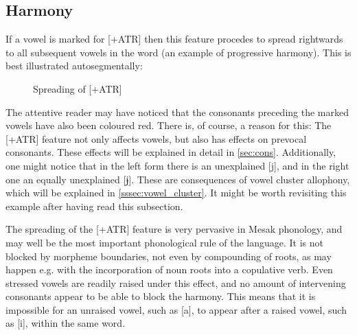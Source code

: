 \documentclass[paper=6in:9in, fontsize=10.5]{scrbook}
\newcommand{\y}{ɨ}
\newcommand{\ý}{ɨ́}
\newcommand{\jbar}{ɉ}
\newcommand{\dom}[1]{\hspace{0pt}{\color{red}#1}}
\begin{document}
\subsection{Harmony} \label{ssec:harmony}

If a vowel is marked for [+ATR] then this feature procedes to spread rightwards to all subsequent vowels in the word (an example of progressive harmony). This is best illustrated autosegmentally:
\begin{figure}[H]
\centering

\caption{Spreading of [+ATR]}
\end{figure}

The attentive reader may have noticed that the consonants preceding the marked vowels have also been coloured red. There is, of course, a reason for this: The [+ATR] feature not only affects vowels, but also has effects on prevocal consonants. These effects will be explained in detail in \ref{sec:cons}. Additionally, one might notice that in the left form there is an unexplained [j], and in the right one an equally unexplained [\jbar]. These are consequences of vowel cluster allophony, which will be explained in \ref{sssec:vowel_cluster}. It might be worth revisiting this example after having read this subsection.

The spreading of the [+ATR] feature is very pervasive in Mesak phonology, and may well be the most important phonological rule of the language. It is not blocked by morpheme boundaries, not even by compounding of roots, as may happen e.g. with the incorporation of noun roots into a copulative verb. Even stressed vowels are readily raised under this effect, and no amount of intervening consonants appear to be able to block the harmony. This means that it is impossible for an unraised vowel, such as [a], to appear after a raised vowel, such as [i], within the same word. 
\end{document}
